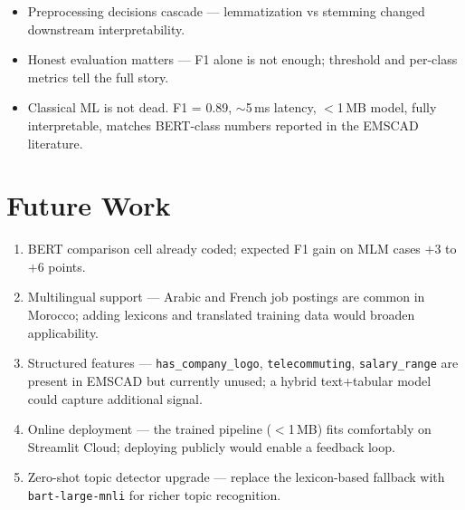 \documentclass[11pt,a4paper]{article}
\newcommand{\code}[1]{\texttt{\small #1}}
\begin{document}
\begin{itemize}
    \item Preprocessing decisions cascade --- lemmatization vs stemming
          changed downstream interpretability.
    \item Honest evaluation matters --- F1 alone is not enough; threshold
          and per-class metrics tell the full story.
    \item Classical ML is not dead. F1 = 0.89, $\sim$5\,ms latency,
          $<$1\,MB model, fully interpretable, matches BERT-class numbers
          reported in the EMSCAD literature.
\end{itemize}

\section{Future Work}

\begin{enumerate}
    \item BERT comparison cell already coded; expected F1 gain on MLM cases
          $+3$ to $+6$ points.
    \item Multilingual support --- Arabic and French job postings are common
          in Morocco; adding lexicons and translated training data would
          broaden applicability.
    \item Structured features --- \code{has\_company\_logo},
          \code{telecommuting}, \code{salary\_range} are present in EMSCAD
          but currently unused; a hybrid text+tabular model could capture
          additional signal.
    \item Online deployment --- the trained pipeline ($<$1\,MB) fits
          comfortably on Streamlit Cloud; deploying publicly would enable a
          feedback loop.
    \item Zero-shot topic detector upgrade --- replace the lexicon-based
          fallback with \code{bart-large-mnli} for richer topic recognition.
\end{enumerate}
\end{document}
